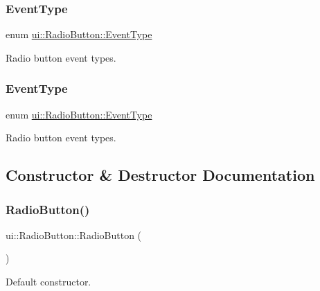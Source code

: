 \subsubsection{\texorpdfstring{Event\+Type}{EventType}\hspace{0.1cm}{\footnotesize\ttfamily [1/2]}}
{\footnotesize\ttfamily enum \hyperlink{classui_1_1RadioButton_a1c4ce5b1a335b0cefe45808754818648}{ui\+::\+Radio\+Button\+::\+Event\+Type}\hspace{0.3cm}{\ttfamily [strong]}}

Radio button event types. \mbox{\label{classui_1_1RadioButton_a1c4ce5b1a335b0cefe45808754818648}} 
\subsubsection{\texorpdfstring{Event\+Type}{EventType}\hspace{0.1cm}{\footnotesize\ttfamily [2/2]}}
{\footnotesize\ttfamily enum \hyperlink{classui_1_1RadioButton_a1c4ce5b1a335b0cefe45808754818648}{ui\+::\+Radio\+Button\+::\+Event\+Type}\hspace{0.3cm}{\ttfamily [strong]}}

Radio button event types. 

\subsection{Constructor \& Destructor Documentation}
\mbox{\label{classui_1_1RadioButton_a7ef838f67df79ff9241d0dd266b0f90d}} 
\subsubsection{\texorpdfstring{Radio\+Button()}{RadioButton()}\hspace{0.1cm}{\footnotesize\ttfamily [1/2]}}
{\footnotesize\ttfamily ui\+::\+Radio\+Button\+::\+Radio\+Button (\begin{DoxyParamCaption}{ }\end{DoxyParamCaption})}

Default constructor.


